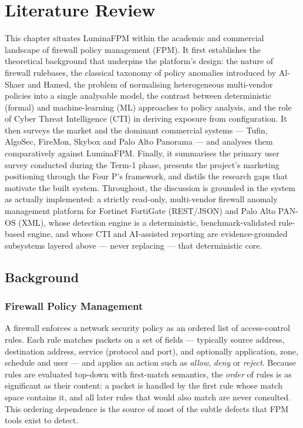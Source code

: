 \chapter{Literature Review}
\label{ch2-literature-review}

This chapter situates LuminaFPM within the academic and commercial landscape of firewall policy management (FPM). It first establishes the theoretical background that underpins the platform's design: the nature of firewall rulebases, the classical taxonomy of policy anomalies introduced by Al-Shaer and Hamed, the problem of normalising heterogeneous multi-vendor policies into a single analysable model, the contrast between deterministic (formal) and machine-learning (ML) approaches to policy analysis, and the role of Cyber Threat Intelligence (CTI) in deriving exposure from configuration. It then surveys the market and the dominant commercial systems --- Tufin, AlgoSec, FireMon, Skybox and Palo Alto Panorama --- and analyses them comparatively against LuminaFPM. Finally, it summarises the primary user survey conducted during the Term-1 phase, presents the project's marketing positioning through the Four P's framework, and distils the research gaps that motivate the built system. Throughout, the discussion is grounded in the system as actually implemented: a strictly read-only, multi-vendor firewall anomaly management platform for Fortinet FortiGate (REST/JSON) and Palo Alto PAN-OS (XML), whose detection engine is a deterministic, benchmark-validated rule-based engine, and whose CTI and AI-assisted reporting are evidence-grounded subsystems layered above --- never replacing --- that deterministic core.

\section{Background}
\label{sec:ch2-background}

\subsection{Firewall Policy Management}
A firewall enforces a network security policy as an ordered list of access-control rules. Each rule matches packets on a set of fields --- typically source address, destination address, service (protocol and port), and optionally application, zone, schedule and user --- and applies an action such as \emph{allow}, \emph{deny} or \emph{reject}. Because rules are evaluated top-down with first-match semantics, the \emph{order} of rules is as significant as their content: a packet is handled by the first rule whose match space contains it, and all later rules that would also match are never consulted. This ordering dependence is the source of most of the subtle defects that FPM tools exist to detect.


